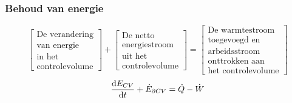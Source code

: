 \documentclass[t]{beamer}
\begin{document}
  	\begin{frame}
		\frametitle{Behoud van energie}
		\vspace{0.5cm}
		\begin{equation*}
			\left[
				\begin{array}{c}
					\mbox{De verandering} \\ \mbox{van energie} \\ \mbox{in het} \\ \mbox{controlevolume}
				\end{array}
			\right]
			+
			\left[
				\begin{array}{c}
					\mbox{De netto} \\ \mbox{energiestroom} \\ \mbox{uit het} \\ \mbox{controlevolume}
				\end{array}
			\right]
			=
			\left[
				\begin{array}{c}
					\mbox{De warmtestroom} \\ \mbox{toegevoegd en} \\   \mbox{arbeidsstroom} \\ \mbox{onttrokken aan } \\ \mbox{het controlevolume}
				\end{array}
			\right]
			\label{eqn:controlevolume,behoud van energie,woorden}
		\end{equation*}
		\vspace{1cm}
		\pause
		\begin{equation}
			\frac{\mathrm{d} E_{CV}}{\mathrm{d} t} + \dot{E}_{\partial CV} =  \dot{Q}-\dot{W}
			\label{eqn:controlevolume,behoud van energie}
		\end{equation}
	\end{frame}	
\end{document}
